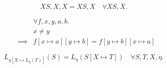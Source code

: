 \documentclass{llncs}
\renewcommand*{\|}{\;|\;}
\begin{document}
\begin{lemma}
  \label{lemma:environment_compaction}
  \begin{equation*}
    XS, X, X = XS, X \quad \forall XS, X.
  \end{equation*}
\end{lemma}

\begin{lemma}
  \label{lemma:overriding_exchange}
  \begin{eqnarray*}
    &&         \forall f, x, y, a, b. \\
    &&         x \neq y \\
    &\implies& f[x \mapsto a][y \mapsto b] = f[y \mapsto b][x \mapsto a]
  \end{eqnarray*}
\end{lemma}

\begin{lemma}
  \label{lemma:substitution_trace_language}
  \begin{equation*}
    L_{\eta[X \mapsto L_\eta(T)]}(S) = L_\eta(S[X \mapsto T]) \quad \forall S, T, X, \eta.
  \end{equation*}
\end{lemma}
\end{document}
